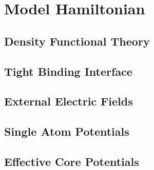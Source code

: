\chapter{Model Hamiltonian}


\section{Density Functional Theory}


\section{Tight Binding Interface}


\section{External Electric Fields}


\section{Single Atom Potentials}



\section{Effective Core Potentials}



